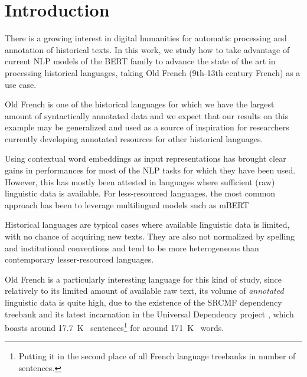 \section{Introduction}
There is a growing interest in digital humanities for automatic processing and annotation of historical texts. In this work, we study how to take advantage of current NLP models of the BERT family to advance the state of the art in processing historical languages, taking Old French (9th-13th century French) as a use case.

Old French is one of the historical languages for which we have the largest amount of syntactically annotated data and we expect that our results on this example may be generalized and used as a source of inspiration for researchers currently developing annotated resources for other historical languages.

Using contextual word embeddings as input representations has brought clear gains in performances for most of the NLP tasks for which they have been used.
However, this has mostly been attested in languages where sufficient (raw) linguistic data is available.
For less-resourced languages, the most common approach has been to leverage multilingual models such as mBERT \citep{devlin-etal-2019-bert}

Historical languages are typical cases where available linguistic data is limited, with no chance of acquiring new texts. They are also not normalized by spelling and institutional conventions and tend to be more heterogeneous than contemporary lesser-resourced languages.

Old French is a particularly interesting language for this kind of study, since relatively to its limited amount of available raw text, its volume of \emph{annotated} linguistic data is quite high, due to the existence of the SRCMF dependency treebank \citep{SRCMF2013PrevostStein} and its latest incarnation in the Universal Dependency project \citep{nivre-etal-2020-universal}, which boasts around \SI{17.7}{K\quantity} sentences\footnote{Putting it in the second place of all French language treebanks in number of sentences.} 
for around \SI{171}{K\quantity} words.

